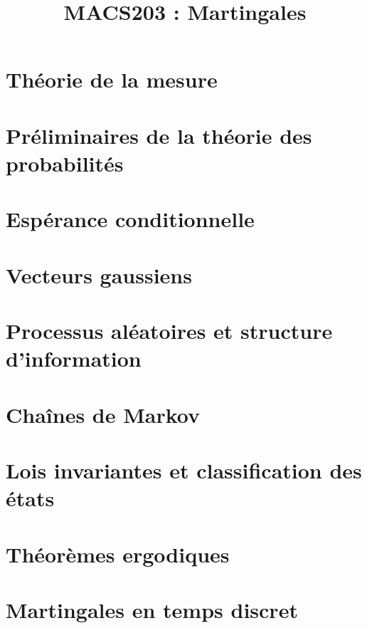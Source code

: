 \documentclass[a4paper,9pt]{article}
\title{\vspace{-1.2cm} \textbf{MACS203 : Martingales}}
\begin{document}
\maketitle

\vspace{-1.5cm}

\section{Théorie de la mesure}

	

\section{Préliminaires de la théorie des probabilités}

	

\section{Espérance conditionnelle}

	

\section{Vecteurs gaussiens}

	

\section{Processus aléatoires et structure d'information}

	

\section{Chaînes de Markov}

	

\section{Lois invariantes et classification des états}

	

\section{Théorèmes ergodiques}

	

\section{Martingales en temps discret}

	
\end{document}
